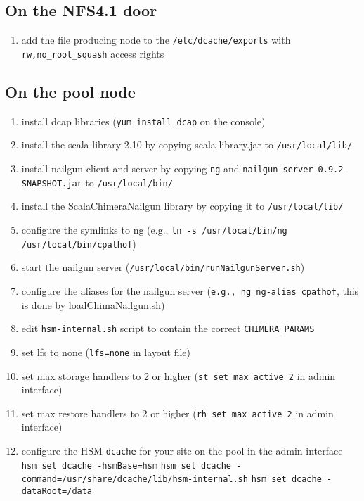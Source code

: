 \documentclass[a4paper,8pt]{scrartcl}
\begin{document}
\subsection{On the NFS4.1 door}
\begin{enumerate}
  \item add the file producing node to the \texttt{/etc/dcache/exports} with
    \texttt{rw,no\_root\_squash} access rights
\end{enumerate}

\subsection{On the pool node}
\begin{enumerate}
  \item install dcap libraries (\texttt{yum install dcap} on the console)
  \item install the scala-library 2.10 by copying scala-library.jar to \texttt{/usr/local/lib/}
  \item install nailgun client and server by copying \texttt{ng} and \texttt{nailgun-server-0.9.2-SNAPSHOT.jar} to \texttt{/usr/local/bin/}
  \item install the ScalaChimeraNailgun library by copying it to \texttt{/usr/local/lib/}
  \item configure the symlinks to ng (e.g., \texttt{ln -s /usr/local/bin/ng /usr/local/bin/cpathof})
  \item start the nailgun server (\texttt{/usr/local/bin/runNailgunServer.sh})
  \item configure the aliases for the nailgun server (\texttt{e.g., ng ng-alias cpathof}, this is done by loadChimaNailgun.sh)
  \item edit \texttt{hsm-internal.sh} script to contain the correct \texttt{CHIMERA\_PARAMS}
  \item set lfs to none (\texttt{lfs=none} in layout file)
  \item set max storage handlers to 2 or higher (\texttt{st set max active 2} in admin interface)
  \item set max restore handlers to 2 or higher (\texttt{rh set max active 2} in admin interface)
  \item configure the HSM \texttt{dcache} for your site on the pool in the admin interface
     \texttt{hsm set dcache -hsmBase=hsm}
     \texttt{hsm set dcache -command=/usr/share/dcache/lib/hsm-internal.sh}
     \texttt{hsm set dcache -dataRoot=/data}
\end{enumerate}
\end{document}
